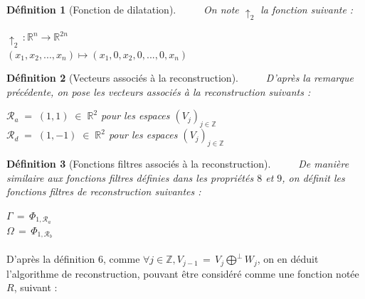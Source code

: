\documentclass[a4paper,10pt]{report}
\theoremstyle{break}
\newtheorem{Def}{D\'{e}finition}
\begin{document}
    \begin{Def}[Fonction de dilatation]
	$\phantom{Prop}$ On note $\uparrow_2 $ la fonction suivante :
	\begin{center}
	  $ \uparrow_2 \, : \mathbb{R}^n \longrightarrow \mathbb{R}^{2 n} $ \\
	  $ (x_1, x_2, ..., x_n) \longmapsto (x_1,0, x_2, 0, ..., 0, x_n) $
	\end{center}
    \end{Def}

    \begin{Def}[Vecteurs associ\'{e}s \`{a} la reconstruction]
      $\phantom{Prop}$ D'apr\`{e}s la remarque pr\'{e}c\'{e}dente, on pose les vecteurs associ\'{e}s \`{a} la reconstruction suivants :
      \begin{center}
	$ \mathcal{R}_a \; = \; (1, 1) \; \in \; \mathbb{R}^2 $ pour les espaces $(V_j)_{j \in \mathbb{Z}}$ \\
	$ \mathcal{R}_d \; = \; (1, -1) \; \in \; \mathbb{R}^2 $ pour les espaces $(V_j)_{j \in \mathbb{Z}}$
      \end{center}
    \end{Def}
    
    \begin{Def}[Fonctions filtres associ\'{e}s \`{a} la reconstruction]
      $\phantom{Prop}$ De mani\`{e}re similaire aux fonctions filtres d\'{e}finies dans les propri\'{e}t\'{e}s $8$ et $9$, 
      on d\'{e}finit les fonctions filtres de reconstruction suivantes :
      \begin{center}
	$ \varGamma \, = \, \Phi_{1, \mathcal{R}_a} $ \\
	$ \varOmega \, = \, \Phi_{1, \mathcal{R}_b} $
      \end{center}

    \end{Def}

\newpage

    \paragraph{} D'apr\`{e}s la d\'{e}finition 6, comme $ \forall j \in \mathbb{Z}, V_{j - 1} \, = \, V_j \displaystyle \bigoplus^\perp W_j $, on en 
	d\'{e}duit l'algorithme de reconstruction, pouvant \^{e}tre consid\'{e}r\'{e} comme une fonction not\'{e}e $R$, suivant :
    
\end{document}
